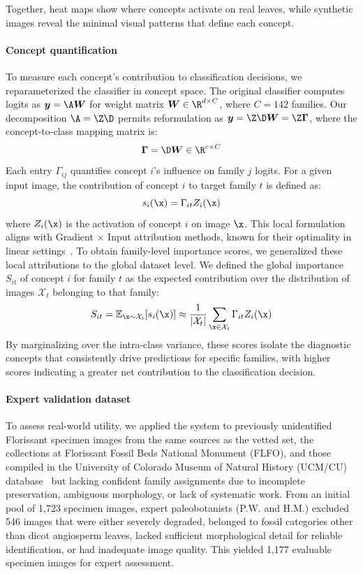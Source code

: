 \documentclass[pdflatex,lineno,sn-nature]{sn-jnl}%
\theoremstyle{plain}%
\theoremstyle{definition}%
\theoremstyle{remark}%
\begin{document}
Together, heat maps show where concepts activate on real leaves, while synthetic images reveal the minimal visual patterns that define each concept.


\paragraph{Concept quantification}
To measure each concept's contribution to classification decisions, we reparameterized the classifier in concept space. The original classifier computes logits as $\bm{y} = \A\bm{W}$ for weight matrix $\bm{W} \in \R^{d \times C}$, where $C = 142$ families. Our decomposition $\A = \Z\D$ permits reformulation as $\bm{y} = \Z\D\bm{W} = \Z\bm{\Gamma}$, where the concept-to-class mapping matrix is:
\[
\bm{\Gamma} = \D\bm{W} \in \R^{c \times C}
\]
Each entry $\Gamma_{ij}$ quantifies concept $i$'s influence on family $j$ logits. For a given input image, the contribution of concept $i$ to target family $t$ is defined as:
\[
s_i(\x) = \Gamma_{it} Z_i(\x)
\]
where $Z_i(\x)$ is the activation of concept $i$ on image $\x$. This local formulation aligns with Gradient $\times$ Input attribution methods, known for their optimality in linear settings~\citep{holistic}. To obtain family-level importance scores, we generalized these local attributions to the global dataset level. We defined the global importance $S_{it}$ of concept $i$ for family $t$ as the expected contribution over the distribution of images $\mathcal{X}_t$ belonging to that family:
\[
S_{it} = \mathbb{E}_{\x \sim \mathcal{X}_t} [s_i(\x)] \approx \frac{1}{|\mathcal{X}_t|} \sum_{\x \in \mathcal{X}_t} \Gamma_{it} Z_i(\x)
\]
By marginalizing over the intra-class variance, these scores isolate the diagnostic concepts that consistently drive predictions for specific families, with higher scores indicating a greater net contribution to the classification decision.


\paragraph{Expert validation dataset}
To assess real-world utility, we applied the system to previously unidentified Florissant specimen images from the same sources as the vetted set, the collections at Florissant Fossil Beds National Monument (FLFO), and those compiled in the University of Colorado Museum of Natural History (UCM/CU) database~\citep{florissant} but lacking confident family assignments due to incomplete preservation, ambiguous morphology, or lack of systematic work. From an initial pool of 1,723 specimen images, expert paleobotanists (P.W. and H.M.) excluded 546 images that were either severely degraded, belonged to fossil categories other than dicot angiosperm leaves, lacked sufficient morphological detail for reliable identification, or had inadequate image quality. This yielded 1,177 evaluable specimen images for expert assessment.
\end{document}
